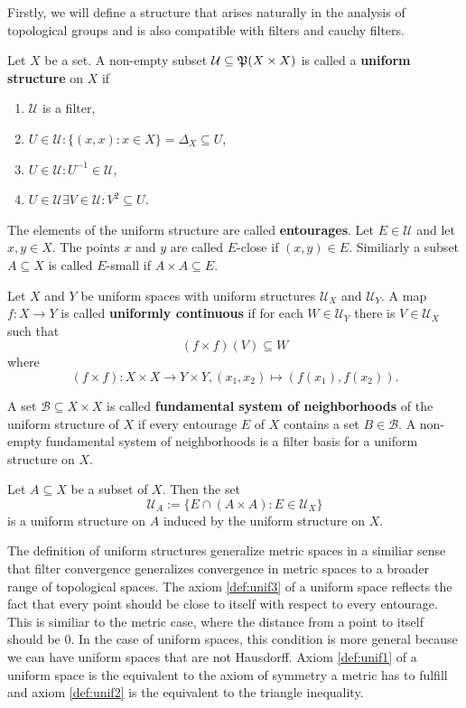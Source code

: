 Firstly, we will define a structure that arises naturally in the analysis of topological groups and is also compatible with filters and cauchy filters.
\begin{defin}
  Let $X$ be a set. A non-empty subset $\mathcal{U} \subseteq \mathfrak{P}(X\times X)$ is called a \textbf{uniform structure} on $X$ if
  \begin{enumerate}
    \item $\mathcal{U}$ is a filter,
    \item\label{def:unif3} $U\in\mathcal{U}\colon \{(x,x)\colon x\in X\} = \Delta_X \subseteq U$,
    \item\label{def:unif1} $U \in \mathcal{U}\colon U^{-1} \in \mathcal{U}$,
    \item\label{def:unif2} $U \in \mathcal{U}\exists V\in \mathcal{U}\colon V^2 \subseteq U$.
  \end{enumerate}
  The elements of the uniform structure are called \textbf{entourages}. Let $E \in \mathcal{U}$ and let $x, y \in X$. The points $x$ and $y$ are called $E$-close if $(x, y) \in E$. Similiarly a subset $A \subseteq X$ is called $E$-small if $A\times A \subseteq E$.
  
  Let $X$ and $Y$ be uniform spaces with uniform structures $\mathcal{U}_X$ and $\mathcal{U}_Y$. A map $f\colon X \to Y$ is called \textbf{uniformly continuous} if for each $W \in \mathcal{U}_Y$ there is $V \in \mathcal{U}_X$ such that $$(f\times f)(V) \subseteq W$$ where $$(f\times f) \colon X\times X \to Y \times Y, (x_1, x_2) \mapsto (f(x_1), f(x_2)).$$

  A set $\mathcal{B} \subseteq X\times X$ is called \textbf{fundamental system of neighborhoods} of the uniform structure of $X$ if every entourage $E$ of $X$ contains a set $B \in \mathcal{B}$. A non-empty fundamental system of neighborhoods is a filter basis for a uniform structure on $X$.

  Let $A \subseteq X$ be a subset of $X$. Then the set $$\mathcal{U}_A := \{E \cap (A\times A)\colon E\in \mathcal{U}_X\}$$ is a uniform structure on $A$ induced by the uniform structure on $X$.  
\end{defin}
The definition of uniform structures generalize metric spaces in a similiar sense that filter convergence generalizes convergence in metric spaces to a broader range of topological spaces. The axiom \ref{def:unif3} of a uniform space reflects the fact that every point should be close to itself with respect to every entourage. This is similiar to the metric case, where the distance from a point to itself should be 0. In the case of uniform spaces, this condition is more general because we can have uniform spaces that are not Hausdorff. Axiom \ref{def:unif1} of a uniform space is the equivalent to the axiom of symmetry a metric has to fulfill and axiom \ref{def:unif2} is the equivalent to the triangle inequality.  

